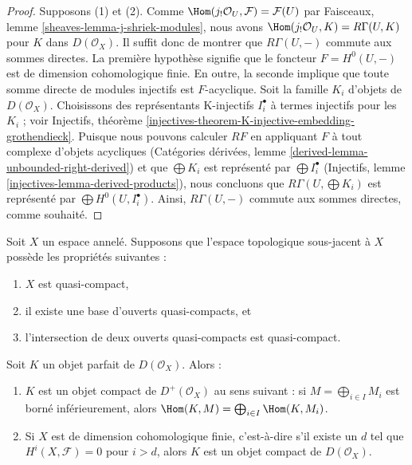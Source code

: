{\begin{lemma}
\end{lemma}

\begin{proof}

Supposons (1) et (2). Comme
$\Hom(j_!\mathcal{O}_U, \mathcal{F}) = \mathcal{F}(U)$
par Faisceaux, lemme \ref{sheaves-lemma-j-shriek-modules},
nous avons $\Hom(j_!\mathcal{O}_U, K) = R\Gamma(U, K)$ pour
$K$ dans $D(\mathcal{O}_X)$. Il suffit donc de montrer que $R\Gamma(U, -)$ commute aux sommes directes.
La première hypothèse signifie que le foncteur
$F = H^0(U, -)$ est de dimension cohomologique finie. En outre, la seconde implique que toute somme directe de modules injectifs est $F$-acyclique. Soit la famille $K_i$ d'objets de $D(\mathcal{O}_X)$. Choisissons des représentants K-injectifs $I_i^\bullet$ à termes injectifs pour les $K_i$ ; voir Injectifs, théorème
\ref{injectives-theorem-K-injective-embedding-grothendieck}. Puisque nous pouvons calculer $RF$ en appliquant $F$ à tout complexe d'objets acycliques (Catégories dérivées, lemme \ref{derived-lemma-unbounded-right-derived}) et que $\bigoplus K_i$ est représenté par $\bigoplus I_i^\bullet$
(Injectifs, lemme \ref{injectives-lemma-derived-products}), nous concluons que $R\Gamma(U, \bigoplus K_i)$ est représenté par
$\bigoplus H^0(U, I_i^\bullet)$. Ainsi, $R\Gamma(U, -)$ commute aux sommes directes, comme souhaité.

\end{proof}

\begin{lemma}

\label{lemma-perfect-is-compact}

Soit $X$ un espace annelé. Supposons que l'espace topologique sous-jacent à $X$ possède les propriétés suivantes :

\begin{enumerate}

\item  $X$ est quasi-compact,
\item il existe une base d'ouverts quasi-compacts, et
\item l'intersection de deux ouverts quasi-compacts est quasi-compact.

\end{enumerate}

Soit $K$ un objet parfait de $D(\mathcal{O}_X)$. Alors :

\begin{enumerate}

\item[(a)] $K$ est un objet compact de $D^+(\mathcal{O}_X)$
au sens suivant : si $M = \bigoplus_{i \in I} M_i$ est borné inférieurement, alors $\Hom(K, M) = \bigoplus_{i \in I} \Hom(K, M_i)$.
\item[b)] Si $X$ est de dimension cohomologique finie, c'est-à-dire s'il existe un $d$ tel que $H^i(X, \mathcal{F}) = 0$ pour $i > d$, alors
$K$ est un objet compact de $D(\mathcal{O}_X)$.


\end{enumerate}
\end{lemma}}
